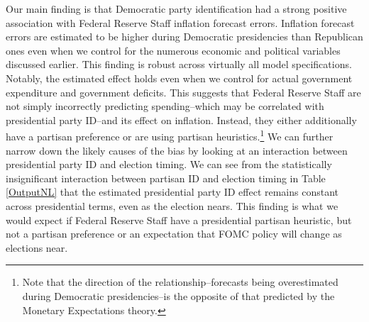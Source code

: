 \documentclass[a4paper]{article}
\begin{document}
Our main finding is that Democratic party identification had a strong positive association with Federal Reserve Staff inflation forecast errors. Inflation forecast errors are estimated to be higher during Democratic presidencies than Republican ones even when we control for the numerous economic and political variables discussed earlier. This finding is robust across virtually all model specifications. Notably, the estimated effect holds even when we control for actual government expenditure and government deficits. This suggests that Federal Reserve Staff are not simply incorrectly predicting spending--which may be correlated with presidential party ID--and its effect on inflation. Instead, they either additionally have a partisan preference or are using partisan heuristics.\footnote{Note that the direction of the relationship--forecasts being overestimated during Democratic presidencies--is the opposite of that predicted by the Monetary Expectations theory.} We can further narrow down the likely causes of the bias by looking at an interaction between presidential party ID and election timing. We can see from the statistically insignificant interaction between partisan ID and election timing in Table \ref{OutputNL} that the estimated presidential party ID effect remains constant across presidential terms, even as the election nears. This finding is what we would expect if Federal Reserve Staff have a presidential partisan heuristic, but not a partisan preference or an expectation that FOMC policy will change as elections near.
\end{document}
